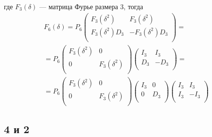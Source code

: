 где $F_3(\delta)$ --- матрица Фурье размера 3, тогда
\begin{multline*}
    F_6(\delta)
    = P_6
    \begin{pmatrix}
        F_3(\delta^2)     & F_3(\delta^2)      \\
        F_3(\delta^2) D_3 & -F_3(\delta^2) D_3 \\
    \end{pmatrix} = \\
    = P_6
    \begin{pmatrix}
        F_3(\delta^2) & 0             \\
        0             & F_3(\delta^2) \\
    \end{pmatrix}
    \begin{pmatrix}
        I_3 & I_3  \\
        D_3 & -D_3 \\
    \end{pmatrix} = \\
    = P_6
    \begin{pmatrix}
        F_3(\delta^2) & 0             \\
        0             & F_3(\delta^2) \\
    \end{pmatrix}
    \begin{pmatrix}
        I_3 & 0   \\
        0   & D_3 \\
    \end{pmatrix}
    \begin{pmatrix}
        I_3 & I_3  \\
        I_3 & -I_3 \\
    \end{pmatrix}
\end{multline*}

\subsection{4 и 2}


